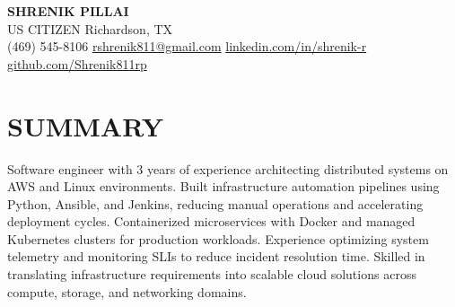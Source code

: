 \documentclass[11pt,letterpaper]{article}
\begin{document}
\begin{center}
{\LARGE \textbf{SHRENIK PILLAI}} \\ \vspace{2pt}
\small US CITIZEN \quad Richardson, TX \\ \vspace{1pt}
\small (469) 545-8106 \quad \href{mailto:rshrenik811@gmail.com}{rshrenik811@gmail.com} \quad \href{https://linkedin.com/in/shrenik-r}{linkedin.com/in/shrenik-r} \quad \href{https://github.com/Shrenik811rp}{github.com/Shrenik811rp}
\end{center}
\section*{SUMMARY}
\noindent\small Software engineer with 3 years of experience architecting distributed systems on AWS and Linux environments. Built infrastructure automation pipelines using Python, Ansible, and Jenkins, reducing manual operations and accelerating deployment cycles. Containerized microservices with Docker and managed Kubernetes clusters for production workloads. Experience optimizing system telemetry and monitoring SLIs to reduce incident resolution time. Skilled in translating infrastructure requirements into scalable cloud solutions across compute, storage, and networking domains.
\end{document}
